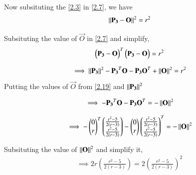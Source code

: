 \documentclass[journal,12pt,twocolumn]{IEEEtran}
\begin{document}






Now subsituting the \ref{2.3} in \ref{2.7}, we have
\begin{align}
\left\lVert  \mathbf{ P_3} - \mathbf{O}\right\rVert^{2} = r^{2} \label{2.20}
\end{align}

Subsituting the value of $\vec{O}$ in \ref{2.7} and simplify,
\begin{align}
\begin{pmatrix}\mathbf{P_3} - \mathbf{O}\end{pmatrix}^T\begin{pmatrix}\mathbf{P_3} - \mathbf{O}\end{pmatrix} = r^2 \label{2.21}
\end{align}


\begin{align}
 \implies \left\lVert\mathbf{P_3}\right\rVert^2 - \mathbf{P_3}^T\mathbf{O}  -  \mathbf{P_3} \mathbf{O}^T +\left\lVert\mathbf{O}\right\rVert^2 = r^2 \label{2.22.1}
\end{align}
Putting the values  of $\vec{O}$ from \ref{2.19} and $\left\lVert\mathbf{P_3}\right\rVert^2$

\begin{align}
\implies - \mathbf{P_3}^T\mathbf{O}  -  \mathbf{P_3} \mathbf{O}^T    = -  \left\lVert\mathbf{O}\right\rVert^2 \label{2.22.22}
\end{align}



\begin{align}
\implies - \begin{pmatrix}0 \\ r\end{pmatrix}^T\begin{pmatrix} \frac{r^2 - 5}{2 \left(r - 3\right)} \\ \frac{r^2 - 5}{2 \left(r - 3\right)} \\\end{pmatrix}  -  \begin{pmatrix}0 \\ r\end{pmatrix} \begin{pmatrix} \frac{r^2 - 5}{2 \left(r - 3\right)} \\ \frac{r^2 - 5}{2 \left(r - 3\right)} \\\end{pmatrix}^T    = -  \left\lVert\mathbf{O}\right\rVert^2 \label{2.22.2}
\end{align}

Subsituting the value of $\left\lVert\mathbf{O}\right\rVert^2$ and simplify it,
\begin{align}
\implies 2r \left( \frac{r^2 - 5}{2 \left(r - 3\right)} \right) = 2 \left( \frac{r^2 - 5}{2 \left(r - 3\right)} \right)^2 
\end{align}
\end{document}
